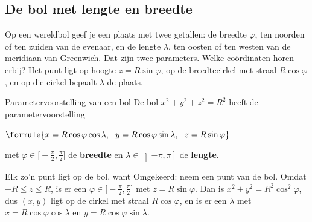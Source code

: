 \subsection{De bol met lengte en breedte}

Op een wereldbol geef je een plaats met twee getallen: de breedte $\varphi$, ten noorden of ten zuiden van de evenaar, en de lengte $\lambda$, ten oosten of ten westen van de meridiaan van Greenwich. Dat zijn twee parameters. Welke coördinaten horen erbij? Het punt ligt op hoogte $z = R\sin\varphi$, op de breedtecirkel met straal $R\cos\varphi$, en op die cirkel bepaalt $\lambda$ de plaats.

\begin{theorie}
\begin{minipage}[t]{.64\linewidth}
\vspace{0pt}
\begin{stelling}{Parametervoorstelling van een bol}
De bol $x^2 + y^2 + z^2 = R^2$ heeft de parametervoorstelling

\vspace{1mm}
\quad $\formule{x = R\cos\varphi\cos\lambda, \ \ y = R\cos\varphi\sin\lambda, \ \ z = R\sin\varphi}$

\vspace{1mm}
met $\varphi \in \bigl[-\tfrac\pi2, \tfrac\pi2\bigr]$ de \textbf{\textcolor{accent}{breedte}} en $\lambda \in \left]-\pi, \pi\right]$ de \textbf{\textcolor{accent}{lengte}}.
\end{stelling}
\end{minipage}\hfill
\begin{minipage}[t]{.32\linewidth}
\vspace{0pt}
\centering
{}
\end{minipage}

\begin{bewijs}
Elk zo'n punt ligt op de bol, want
Omgekeerd: neem een punt van de bol. Omdat $-R \leqslant z \leqslant R$, is er een $\varphi \in \bigl[-\tfrac\pi2, \tfrac\pi2\bigr]$ met $z = R\sin\varphi$. Dan is $x^2 + y^2 = R^2\cos^2\varphi$, dus $(x, y)$ ligt op de cirkel met straal $R\cos\varphi$, en is er een $\lambda$ met $x = R\cos\varphi\cos\lambda$ en $y = R\cos\varphi\sin\lambda$.
\end{bewijs}
\end{theorie}

